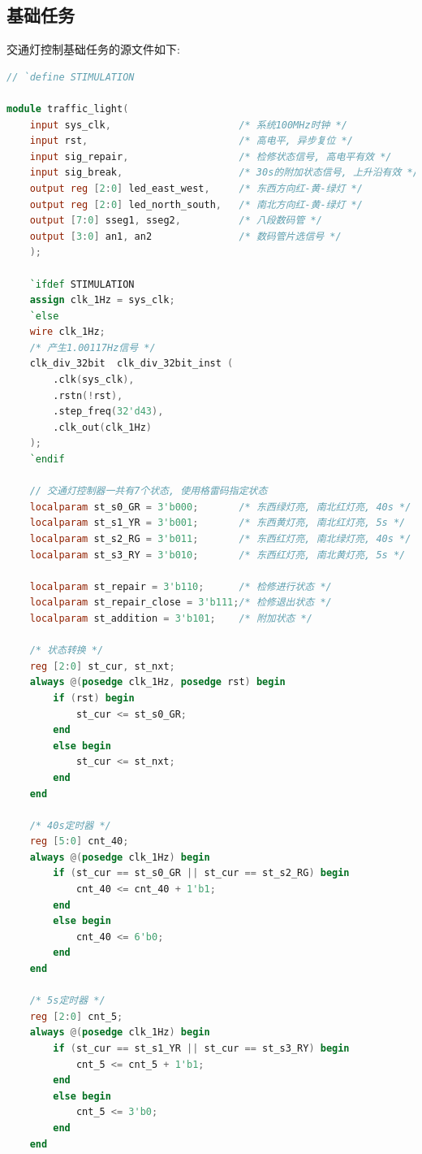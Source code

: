 \documentclass{article}
\begin{document}
\subsection*{基础任务}
交通灯控制基础任务的源文件如下:
\begin{lstlisting}[language=Verilog, caption={交通灯控制基础任务源文件}]
// `define STIMULATION

module traffic_light(
    input sys_clk,                      /* 系统100MHz时钟 */
    input rst,                          /* 高电平, 异步复位 */
    input sig_repair,                   /* 检修状态信号, 高电平有效 */
    input sig_break,                    /* 30s的附加状态信号, 上升沿有效 */
    output reg [2:0] led_east_west,     /* 东西方向红-黄-绿灯 */
    output reg [2:0] led_north_south,   /* 南北方向红-黄-绿灯 */
    output [7:0] sseg1, sseg2,          /* 八段数码管 */
    output [3:0] an1, an2               /* 数码管片选信号 */
    );
    
    `ifdef STIMULATION
    assign clk_1Hz = sys_clk;
    `else
    wire clk_1Hz;
    /* 产生1.00117Hz信号 */
    clk_div_32bit  clk_div_32bit_inst (
        .clk(sys_clk),
        .rstn(!rst),
        .step_freq(32'd43),
        .clk_out(clk_1Hz)
    );
    `endif

    // 交通灯控制器一共有7个状态, 使用格雷码指定状态
    localparam st_s0_GR = 3'b000;       /* 东西绿灯亮, 南北红灯亮, 40s */
    localparam st_s1_YR = 3'b001;       /* 东西黄灯亮, 南北红灯亮, 5s */
    localparam st_s2_RG = 3'b011;       /* 东西红灯亮, 南北绿灯亮, 40s */
    localparam st_s3_RY = 3'b010;       /* 东西红灯亮, 南北黄灯亮, 5s */

    localparam st_repair = 3'b110;      /* 检修进行状态 */
    localparam st_repair_close = 3'b111;/* 检修退出状态 */
    localparam st_addition = 3'b101;    /* 附加状态 */

    /* 状态转换 */
    reg [2:0] st_cur, st_nxt;
    always @(posedge clk_1Hz, posedge rst) begin
        if (rst) begin
            st_cur <= st_s0_GR;
        end
        else begin
            st_cur <= st_nxt;
        end
    end

    /* 40s定时器 */
    reg [5:0] cnt_40;
    always @(posedge clk_1Hz) begin
        if (st_cur == st_s0_GR || st_cur == st_s2_RG) begin
            cnt_40 <= cnt_40 + 1'b1;
        end
        else begin
            cnt_40 <= 6'b0;
        end
    end

    /* 5s定时器 */
    reg [2:0] cnt_5;
    always @(posedge clk_1Hz) begin
        if (st_cur == st_s1_YR || st_cur == st_s3_RY) begin
            cnt_5 <= cnt_5 + 1'b1;
        end
        else begin
            cnt_5 <= 3'b0;
        end
    end


\end{lstlisting}
\end{document}
